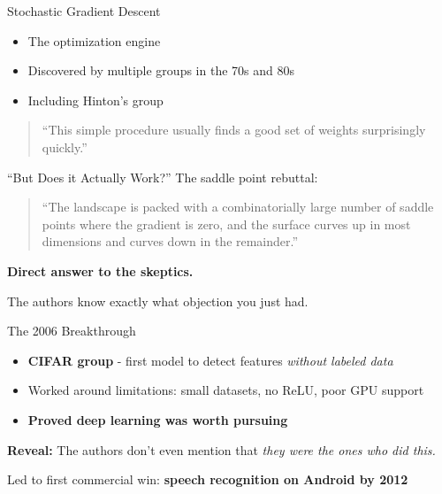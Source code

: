 \begin{frame}{Stochastic Gradient Descent}
    \begin{itemize}
        \item The optimization engine
        \item Discovered by multiple groups in the 70s and 80s
        \item Including Hinton's group
    \end{itemize}
    
    \vspace{1em}
    \begin{quote}
        ``This simple procedure usually finds a good set of weights surprisingly quickly.''
    \end{quote}
\end{frame}

\begin{frame}{``But Does it Actually Work?''}
    The saddle point rebuttal:
    
    \begin{quote}
        ``The landscape is packed with a combinatorially large number of saddle points where the gradient is zero, and the surface curves up in most dimensions and curves down in the remainder.''
    \end{quote}
    
    \vspace{1em}
    \textbf{Direct answer to the skeptics.}
    
    The authors know exactly what objection you just had.
\end{frame}

\begin{frame}{The 2006 Breakthrough}
    \begin{itemize}
        \item \textbf{CIFAR group} - first model to detect features \textit{without labeled data}
        \item Worked around limitations: small datasets, no ReLU, poor GPU support
        \item \textbf{Proved deep learning was worth pursuing}
    \end{itemize}
    
    \vspace{1em}
    \textbf{Reveal:} The authors don't even mention that \textit{they were the ones who did this.}
    
    \vspace{1em}
    Led to first commercial win: \textbf{speech recognition on Android by 2012}
\end{frame}
